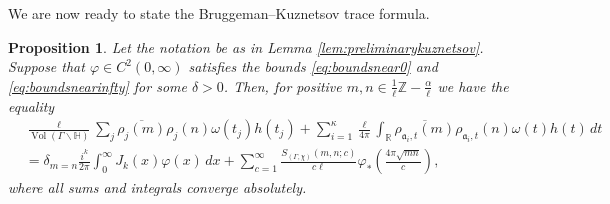 \documentclass{article}
\newtheorem{prop}[thm]{Proposition}
\theoremstyle{named}
\newcommand{\Z}{\mathbb{Z}}
\newcommand{\Hyp}{\mathbb{H}}
\newcommand{\R}{\mathbb{R}}
\renewcommand{\a}{\mathfrak{a}}
\DeclareMathOperator{\vol}{Vol}
\begin{document}
We are now ready to state the Bruggeman--Kuznetsov trace formula.

\begin{prop}\label{prop:forwardkuznetsov}
Let the notation be as in Lemma \ref{lem:preliminarykuznetsov}. Suppose that $\varphi \in C^2(0, \infty)$ satisfies the bounds \eqref{eq:boundsnear0} and \eqref{eq:boundsnearinfty} for some $\delta > 0$. Then, for positive $m,n \in \frac{1}{\ell}\Z - \frac{\alpha}{\ell}$ we have the equality
\begin{equation}\label{eq:kuznetsovtraceformula}
\begin{aligned}
    & \frac{\ell}{\vol(\Gamma\backslash \Hyp)} \sum_j \overline{\rho_j(m)} \rho_j(n) \omega(t_j)h(t_j) + \sum_{i = 1}^\kappa\frac{\ell}{4\pi}\int_\R \overline{\rho_{\a_i, t}(m)}\rho_{\a_i, t}(n) \omega(t)h(t)\, dt\\
    & = \delta_{m = n}\frac{i^k}{2\pi}\int_0^\infty J_k(x)\varphi(x)\, dx + \sum_{c = 1}^\infty \frac{S_{(\Gamma, \chi)}(m, n; c)}{c\ell}\varphi_*\left(\frac{4\pi\sqrt{mn}}{c}\right),
\end{aligned}
\end{equation} 
where all sums and integrals converge absolutely.
\end{prop}
\end{document}
